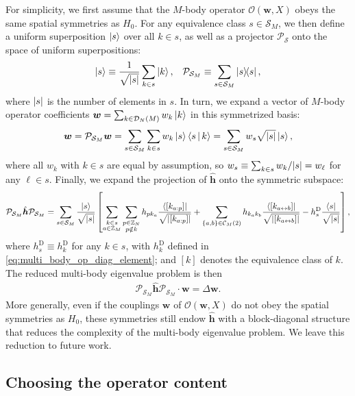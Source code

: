 \documentclass[nofootinbib,notitlepage,11pt]{revtex4-2}
\renewcommand{\t}{\text} %
\newcommand{\f}[2]{\dfrac{#1}{#2}} %
\newcommand{\p}[1]{\left(#1\right)} %
\renewcommand{\sp}[1]{\left[#1\right]} %
\renewcommand{\set}[1]{\left\{#1\right\}} %
\newcommand{\bk}{\Braket} %
\renewcommand{\c}{\cdot} %
\newcommand{\m}{\bm} %
\newcommand{\1}{\mathds{1}}
\newcommand{\C}{\mathcal{C}}
\newcommand{\D}{\mathcal{D}}
\renewcommand{\O}{\mathcal{O}}
\renewcommand{\P}{\mathcal{P}}
\renewcommand{\S}{\mathcal{S}}
\newcommand{\ZZ}{\mathbb{Z}}
\newcommand{\lra}{\leftrightarrow}
\begin{document}
For simplicity, we first assume that the $M$-body operator
$\O\p{\m w,X}$ obeys the same spatial symmetries as $H_0$.  For any
equivalence class $s\in\S_M$, we then define a uniform superposition
$\ket{s}$ over all $k\in s$, as well as a projector $\P_\S$ onto the
space of uniform superpositions:
\begin{align}
  \ket{s} \equiv \f1{\sqrt{\abs{s}}} \sum_{k\in s} \ket{k},
  &&
  \P_{\S_M} \equiv \sum_{s\in\S_M} \op{s},
\end{align}
where $\abs{s}$ is the number of elements in $s$.  In turn, we expand
a vector of $M$-body operator coefficients
$\m w=\sum_{k\in\D_N\p{M}}w_k\ket{k}$ in this symmetrized basis:
\begin{align}
  \m w = \P_{\S_M} \m w
  = \sum_{s\in\S_M} \sum_{k\in s} w_k \ket{s} \bk{s|k}
  = \sum_{s\in\S_M} w_s \sqrt{\abs{s}} \ket{s},
\end{align}
where all $w_k$ with $k\in s$ are equal by assumption, so
$w_s\equiv\sum_{k\in s}w_k/\abs{s}=w_\ell$ for any $\ell\in s$.
Finally, we expand the projection of $\hat{\m h}$ onto the symmetric
subspace:
\begin{align}
  \P_{\S_M} \hat{\m h} \P_{\S_M}
  = \sum_{s\in\S_M} \f{\ket{s}}{\sqrt{\abs{s}}} \sp{
    \sum_{\substack{k\in s\\a\in\ZZ_M}}
    \sum_{\substack{p\in\ZZ_N\\p\notin k}}
    h_{p k_a} \f{\bra{\sp{k_{a:p}}}}{\sqrt{\abs{\sp{k_{a:p}}}}}
    + \sum_{\set{a,b}\in\C_M\p{2}} h_{k_ak_b}
    \f{\bra{\sp{k_{a\lra b}}}}{\sqrt{\abs{\sp{k_{a\lra b}}}}}
    - h^{\t{D}}_s \f{\bra{s}}{\sqrt{\abs{s}}}},
\end{align}
where $h^{\t{D}}_s\equiv h^{\t{D}}_k$ for any $k\in s$, with
$h^{\t{D}}_k$ defined in \eqref{eq:multi_body_op_diag_element}; and
$\sp{k}$ denotes the equivalence class of $k$.  The reduced multi-body
eigenvalue problem is then
\begin{align}
  \P_{\S_M} \hat{\m h} \P_{\S_M} \c \m w = \Delta \m w.
\end{align}
More generally, even if the couplings $\m w$ of $\O\p{\m w,X}$ do not
obey the spatial symmetries as $H_0$, these symmetries still endow
$\hat{\m h}$ with a block-diagonal structure that reduces the
complexity of the multi-body eigenvalue problem.  We leave this
reduction to future work.  %

\subsection{Choosing the operator content}
\label{sec:operator_content}
\end{document}
